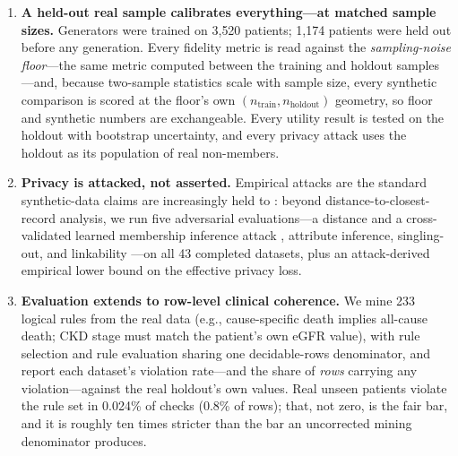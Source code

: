 \documentclass[11pt,a4paper]{article}
\begin{document}
\begin{enumerate}
\item \textbf{A held-out real sample calibrates everything---at matched sample
sizes.} Generators were trained on 3{,}520 patients; 1{,}174 patients were held out
before any generation. Every fidelity metric is read against the
\emph{sampling-noise floor}---the same metric computed between the training and
holdout samples---and, because two-sample statistics scale with sample size, every
synthetic comparison is scored at the floor's own $(n_\text{train},
n_\text{holdout})$ geometry, so floor and synthetic numbers are exchangeable.
Every utility result is tested on the holdout with bootstrap uncertainty, and every
privacy attack uses the holdout as its population of real non-members.
\item \textbf{Privacy is attacked, not asserted.} Empirical attacks are the
standard synthetic-data claims are increasingly held to
\citep{stadler2022synthetic}: beyond distance-to-closest-record analysis, we run
five adversarial evaluations---a distance and a cross-validated learned membership
inference attack \citep{shokri2017membership}, attribute inference, singling-out,
and linkability \citep{giomi2023unified}---on all 43 completed datasets, plus an
attack-derived empirical lower bound on the effective privacy loss.
\item \textbf{Evaluation extends to row-level clinical coherence.} We mine 233
logical rules from the real data (e.g., cause-specific death implies all-cause
death; CKD stage must match the patient's own eGFR value), with rule selection and
rule evaluation sharing one decidable-rows denominator, and report each dataset's
violation rate---and the share of \emph{rows} carrying any violation---against the
real holdout's own values. Real unseen patients violate the rule set in 0.024\% of
checks (0.8\% of rows); that, not zero, is the fair bar, and it is roughly ten
times stricter than the bar an uncorrected mining denominator produces.
\end{enumerate}
\end{document}
